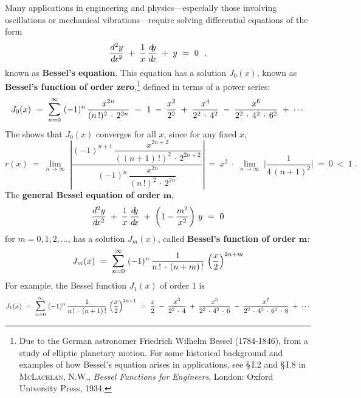 Many applications in engineering and physics---especially those involving
oscillations or mechanical vibrations---require solving differential equations
of the form
\begin{equation}\label{eqn:besseldiffeq}
\frac{d^2y}{d\!x^2} \;+\; \frac{1}{x}\,\frac{d\negmedspace y}{d\!x} \;+\; y ~=~ 0 ~~,
\end{equation}
known as \textbf{Bessel's equation}. This equation has
a solution $J_0(x)$, known as
\textbf{Bessel's function of order zero},\footnote{Due to the German astronomer
Friedrich Wilhelm Bessel (1784-1846), from a study of elliptic planetary
motion. For some historical background and examples of how Bessel's equation
arises in applications, see \S\,I.2 and \S\,I.8 in \textsc{McLachlan, N.W.},
\emph{Bessel Functions for Engineers}, London: Oxford University Press, 1934.}
defined in terms of a power series:
\begin{equation}\label{eqn:besselzero}
J_0(x) ~=~ \bigsum{n = 0}{\infty}~ (-1)^n\,\frac{x^{2n}}{(n\,!)^2\,\cdot\,2^{2n}} ~=~
1 \;-\; \frac{x^2}{2^2} \;+\; \frac{x^4}{2^2 \,\cdot\, 4^2} \;-\;
\frac{x^6}{2^2 \,\cdot\, 4^2 \,\cdot\, 6^2} \;+\; \cdots
\end{equation}
The  shows that $J_0(x)$ converges for all $x$, since for any fixed
$x$,
\[
r(x) ~=~ \lim_{n \to \infty} \;\left|\dfrac{(-1)^{n+1}\,\dfrac{x^{2n+2}}{((n+1)\,!)^2\,\cdot\,2^{2n+2}}}
{(-1)^n\,\dfrac{x^{2n}}{(n\,!)^2\,\cdot\,2^{2n}}}\right| ~=~
x^2 \;\cdot\; \lim_{n \to \infty} \;\Biggl|\frac{1}{4\,(n+1)^2}\Biggr| ~=~ 0 ~<~ 1 ~.
\]
\newpage
\noindent The \textbf{general Bessel equation of order $\bm{m}$},
\begin{equation}\label{eqn:besseldiffeqgen}
\frac{d^2y}{d\!x^2} \;+\; \frac{1}{x}\,\frac{d\negmedspace y}{d\!x} \;+\;
\left(1 - \frac{m^2}{x^2}\right)\,y ~=~ 0
\end{equation}
for $m=0,1,2,\ldots$, has a
solution $J_m(x)$, called
\textbf{Bessel's function of order $\bm{m}$}:
\begin{equation}\label{eqn:besselm}\index{Bessel functions!order $m$}
J_m(x) ~=~ \bigsum{n = 0}{\infty}~ (-1)^n\,\frac{1}{n\,! \,\cdot\, (n+m)\,!}\,
\left(\frac{x}{2}\right)^{2n+m}
\end{equation}
For example, the Bessel function $J_1(x)$ of order 1 is
\[
J_1(x) ~=~ \bigsum{n = 0}{\infty}~ (-1)^n\,\frac{1}{n\,! \,\cdot\, (n+1)\,!}\,
\left(\frac{x}{2}\right)^{2n+1} ~=~ \frac{x}{2} \;-\; \frac{x^3}{2^2 \,\cdot\, 4} \;+\;
\frac{x^5}{2^2 \,\cdot\, 4^2 \,\cdot\, 6} \;-\;
\frac{x^7}{2^2 \,\cdot\, 4^2 \,\cdot\, 6^2 \,\cdot\, 8} \;+\; \cdots
\]

